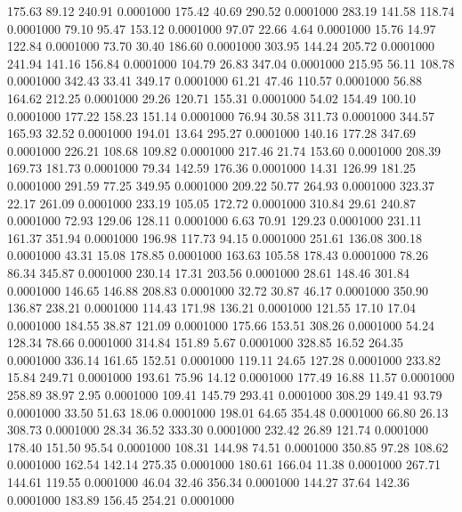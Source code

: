  175.63   89.12  240.91   0.0001000
 175.42   40.69  290.52   0.0001000
 283.19  141.58  118.74   0.0001000
  79.10   95.47  153.12   0.0001000
  97.07   22.66    4.64   0.0001000
  15.76   14.97  122.84   0.0001000
  73.70   30.40  186.60   0.0001000
 303.95  144.24  205.72   0.0001000
 241.94  141.16  156.84   0.0001000
 104.79   26.83  347.04   0.0001000
 215.95   56.11  108.78   0.0001000
 342.43   33.41  349.17   0.0001000
  61.21   47.46  110.57   0.0001000
  56.88  164.62  212.25   0.0001000
  29.26  120.71  155.31   0.0001000
  54.02  154.49  100.10   0.0001000
 177.22  158.23  151.14   0.0001000
  76.94   30.58  311.73   0.0001000
 344.57  165.93   32.52   0.0001000
 194.01   13.64  295.27   0.0001000
 140.16  177.28  347.69   0.0001000
 226.21  108.68  109.82   0.0001000
 217.46   21.74  153.60   0.0001000
 208.39  169.73  181.73   0.0001000
  79.34  142.59  176.36   0.0001000
  14.31  126.99  181.25   0.0001000
 291.59   77.25  349.95   0.0001000
 209.22   50.77  264.93   0.0001000
 323.37   22.17  261.09   0.0001000
 233.19  105.05  172.72   0.0001000
 310.84   29.61  240.87   0.0001000
  72.93  129.06  128.11   0.0001000
   6.63   70.91  129.23   0.0001000
 231.11  161.37  351.94   0.0001000
 196.98  117.73   94.15   0.0001000
 251.61  136.08  300.18   0.0001000
  43.31   15.08  178.85   0.0001000
 163.63  105.58  178.43   0.0001000
  78.26   86.34  345.87   0.0001000
 230.14   17.31  203.56   0.0001000
  28.61  148.46  301.84   0.0001000
 146.65  146.88  208.83   0.0001000
  32.72   30.87   46.17   0.0001000
 350.90  136.87  238.21   0.0001000
 114.43  171.98  136.21   0.0001000
 121.55   17.10   17.04   0.0001000
 184.55   38.87  121.09   0.0001000
 175.66  153.51  308.26   0.0001000
  54.24  128.34   78.66   0.0001000
 314.84  151.89    5.67   0.0001000
 328.85   16.52  264.35   0.0001000
 336.14  161.65  152.51   0.0001000
 119.11   24.65  127.28   0.0001000
 233.82   15.84  249.71   0.0001000
 193.61   75.96   14.12   0.0001000
 177.49   16.88   11.57   0.0001000
 258.89   38.97    2.95   0.0001000
 109.41  145.79  293.41   0.0001000
 308.29  149.41   93.79   0.0001000
  33.50   51.63   18.06   0.0001000
 198.01   64.65  354.48   0.0001000
  66.80   26.13  308.73   0.0001000
  28.34   36.52  333.30   0.0001000
 232.42   26.89  121.74   0.0001000
 178.40  151.50   95.54   0.0001000
 108.31  144.98   74.51   0.0001000
 350.85   97.28  108.62   0.0001000
 162.54  142.14  275.35   0.0001000
 180.61  166.04   11.38   0.0001000
 267.71  144.61  119.55   0.0001000
  46.04   32.46  356.34   0.0001000
 144.27   37.64  142.36   0.0001000
 183.89  156.45  254.21   0.0001000
